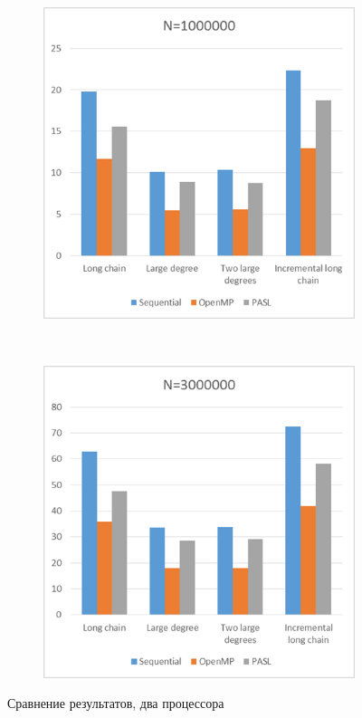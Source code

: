 \documentclass[specification,annotation]{itmo-student-thesis}
\begin{document}
\begin{figure}[!ht]
\begin{subfigure}[b]{0.45\textwidth}
\end{subfigure}\\
\begin{subfigure}[b]{0.45\textwidth}
    \includegraphics[width=\textwidth]{pic/results-2-c.png}
\end{subfigure}~~\begin{subfigure}[b]{0.45\textwidth}
    \includegraphics[width=\textwidth]{pic/results-2-d.png}
\end{subfigure}
\caption{Сравнение результатов, два процессора}\label{fig:results-comparison-2}
\end{figure}
\end{document}
